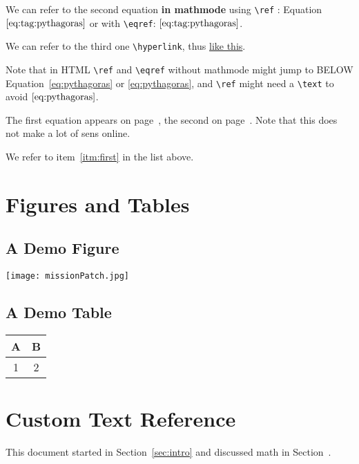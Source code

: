 \documentclass{ximera}
\begin{document}
We can refer to the second equation \textbf{in mathmode} using \verb|\ref| : Equation~$\text{\ref{eq:tag:pythagoras}}$ or with \verb|\eqref|: $\eqref{eq:tag:pythagoras}$.

We can refer to the third one  \verb|\hyperlink|, thus \hyperlink{ht:pythagoras}{like this}.

Note that in HTML \verb|\ref| and \verb|\eqref| without mathmode might jump to BELOW Equation~\ref{eq:pythagoras} or \eqref{eq:pythagoras}, and
\verb|\ref| might need a \verb|\text| to avoid $\ref{eq:pythagoras}$.

The first equation appears on page~\pageref{eq:pythagoras}, the second on page~\pageref{eq:tag:pythagoras}. 
Note that this does not make a lot of sens online.

We refer to item~\ref{itm:first} in the list above.

\section{Figures and Tables}

\subsection{A Demo Figure}
\label{sec:fig}

\begin{image}[0.3\textwidth]
  \centering
  \texttt{[image: missionPatch.jpg]} %
\end{image}
  \label{fig:demo}

\subsection{A Demo Table}

{
  \centering
  \begin{tabular}{|c|c|}
    \hline
    A & B \\
    \hline
    1 & 2 \\
    \hline
  \end{tabular}
  \label{tab:example}
}

\section{Custom Text Reference}

This document started in Section~\ref{sec:intro} and discussed math in Section~.
\end{document}
